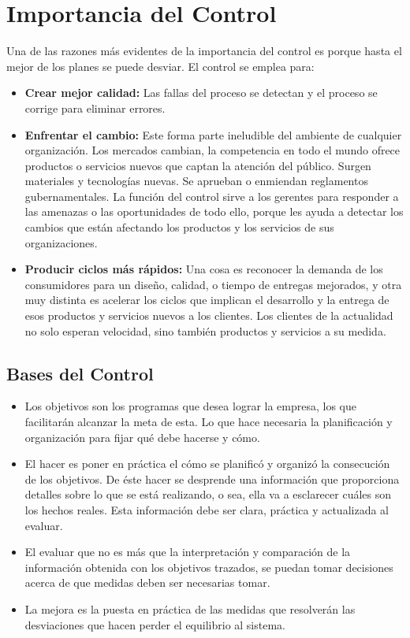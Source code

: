 \documentclass[12pt,letterpaper]{article}
\begin{document}
\section{Importancia del Control}
Una de las razones más evidentes de la importancia del control es porque hasta el mejor de los planes se puede desviar. El control se emplea para:
\begin{itemize}
\item \textbf{Crear mejor calidad:} Las fallas del proceso se detectan y el proceso se corrige para eliminar errores.
\item \textbf{Enfrentar el cambio:} Este forma parte ineludible del ambiente de cualquier organización. Los mercados cambian, la competencia en todo el mundo ofrece productos o servicios nuevos que captan la atención del público. Surgen materiales y tecnologías nuevas. Se aprueban o enmiendan reglamentos gubernamentales. La función del control sirve a los gerentes para responder a las amenazas o las oportunidades de todo ello, porque les ayuda a detectar los cambios que están afectando los productos y los servicios de sus organizaciones.
\item \textbf{Producir ciclos más rápidos:} Una cosa es reconocer la demanda de los consumidores para un diseño, calidad, o tiempo de entregas mejorados, y otra muy distinta es acelerar los ciclos que implican el desarrollo y la entrega de esos productos y servicios nuevos a los clientes. Los clientes de la actualidad no solo esperan velocidad, sino también productos y servicios a su medida.
\end{itemize}
\subsection{Bases del Control}
\begin{itemize}
\item	Los objetivos son los programas que desea lograr la empresa, los que facilitarán alcanzar la meta de esta. Lo que hace necesaria la planificación y organización para fijar qué debe hacerse y cómo.
\item 	El hacer es poner en práctica el cómo se planificó y organizó la consecución de los objetivos. De éste hacer se desprende una información que proporciona detalles sobre lo que se está realizando, o sea, ella va a esclarecer cuáles son los hechos reales. Esta información debe ser clara, práctica y actualizada al evaluar.
\item	El evaluar que no es más que la interpretación y comparación de la información obtenida con los objetivos trazados, se puedan tomar decisiones acerca de que medidas deben ser necesarias tomar.
\item	La mejora es la puesta en práctica de las medidas que resolverán las desviaciones que hacen perder el equilibrio al sistema.
\end{itemize}
\end{document}
